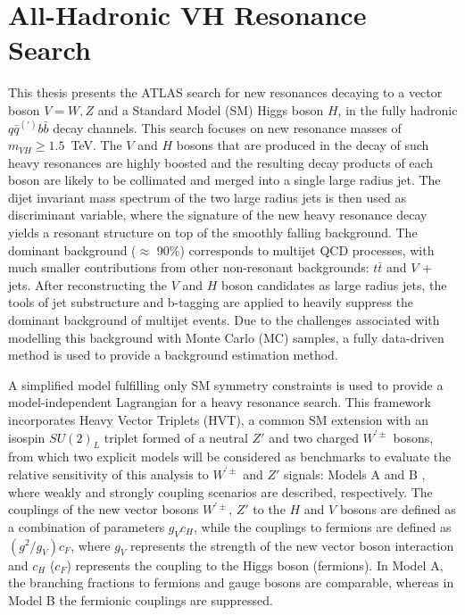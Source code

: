 \graphicspath{{Ch5_VHqqbb/figures/}}

\chapter{All-Hadronic VH Resonance Search}

This thesis presents the ATLAS search for new resonances decaying to a vector boson $V = W,Z$ and a Standard Model (SM) Higgs boson $H$, in the fully hadronic $q\bar{q}^{(\prime)}b\bar{b}$ decay channels.
This search focuses on new resonance masses of $m_{VH} \geq 1.5$~TeV.
The $V$ and $H$ bosons that are produced in the decay of such heavy resonances are highly boosted and the resulting decay products of each boson are likely to be collimated and merged into a single large radius jet.
The dijet invariant mass spectrum of the two large radius jets is then used as discriminant variable, where the signature of the new heavy resonance decay yields a resonant structure on top of the smoothly falling background.
The dominant background ($\approx$ 90\%) corresponds to multijet QCD processes, with much smaller contributions from other non-resonant backgrounds: $t\bar{t}$ and $V$ + jets.
After reconstructing the $V$ and $H$ boson candidates as large radius jets, the tools of jet substructure and b-tagging are applied to heavily suppress the dominant background of multijet events.
Due to the challenges associated with modelling this background with Monte Carlo (MC) samples, a fully data-driven method is used to provide a background estimation method.


A simplified model \cite{Pappadopulo:2014qza} fulfilling only SM symmetry constraints is used to provide a model-independent Lagrangian for a heavy resonance search.
This framework incorporates Heavy Vector Triplets (HVT), a common SM extension with an isospin $SU(2)_{L}$ triplet formed of a neutral $Z'$ and two charged $W^{\prime \pm}$ bosons, from which two explicit models will be considered as benchmarks to evaluate the relative sensitivity of this analysis to $W^{\prime \pm}$ and $Z'$ signals: Models A and B \cite{Pappadopulo:2014qza}, where weakly and strongly coupling scenarios are described, respectively.
The couplings of the new vector bosons $W^{\prime \pm}$, $Z'$ to the $H$ and $V$ bosons are defined as a combination of parameters $g_{V}c_{H}$, while the couplings to fermions are defined as $(g^{2}/g_{V})c_{F}$, where $g_V$ represents the strength of the new vector boson interaction and $c_{H}$ ($c_{F}$) represents the coupling to the Higgs boson (fermions).
In Model A, the branching fractions to fermions and gauge bosons are comparable, whereas in Model B the fermionic couplings are suppressed.

